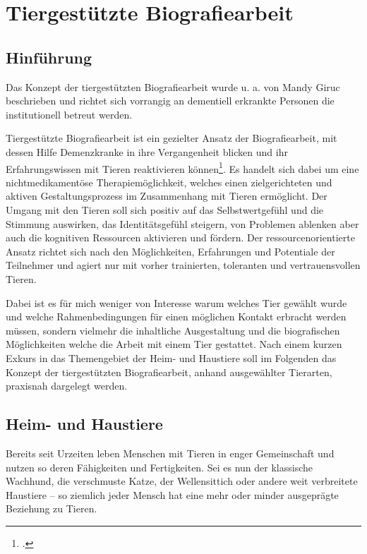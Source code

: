 \section{Tiergestützte Biografiearbeit}
\label{sec:k4_TiergestützteBiografiearbeit}

\subsection{Hinführung}
\label{sec:k4.1_Hinführung}

Das Konzept der tiergestützten Biografiearbeit wurde u. a. von Mandy Giruc beschrieben und richtet sich vorrangig an dementiell erkrankte Personen die institutionell betreut werden.

Tiergestützte Biografiearbeit ist ein gezielter Ansatz der Biografiearbeit, mit dessen Hilfe Demenzkranke in ihre Vergangenheit blicken und ihr Erfahrungswissen mit Tieren reaktivieren können\footcite[32f]{Giruc2011}. Es handelt sich dabei um eine nichtmedikamentöse Therapiemöglichkeit, welches einen zielgerichteten und aktiven Gestaltungsprozess im Zusammenhang mit Tieren ermöglicht. Der Umgang mit den Tieren soll sich positiv auf das Selbstwertgefühl und die Stimmung auswirken, das Identitätsgefühl steigern, von Problemen ablenken aber auch die kognitiven Ressourcen aktivieren und fördern. Der ressourcenorientierte Ansatz richtet sich nach den Möglichkeiten, Erfahrungen und Potentiale der Teilnehmer und agiert nur mit vorher trainierten, toleranten und vertrauensvollen Tieren. 

Dabei ist es für mich weniger von Interesse warum welches Tier gewählt wurde und welche Rahmenbedingungen für einen möglichen Kontakt erbracht werden müssen, sondern vielmehr die inhaltliche Ausgestaltung und die biografischen Möglichkeiten welche die Arbeit mit einem Tier gestattet. Nach einem kurzen Exkurs in das Themengebiet der Heim- und Haustiere soll im Folgenden das Konzept der tiergestützten Biografiearbeit, anhand ausgewählter Tierarten, praxisnah dargelegt werden. 

\subsection{Heim- und Haustiere}
\label{sec:k4.2_HeimUndHaustiere}

Bereits seit Urzeiten leben Menschen mit Tieren in enger Gemeinschaft und nutzen so deren Fähigkeiten und Fertigkeiten. Sei es nun der klassische Wachhund, die verschmuste Katze, der Wellensittich oder andere weit verbreitete Haustiere -- so ziemlich jeder Mensch hat eine mehr oder minder ausgeprägte Beziehung zu Tieren. 


